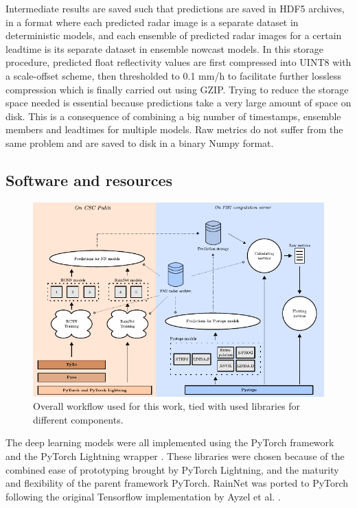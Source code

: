 Intermediate results are saved such that predictions are saved in HDF5 archives, in a format where each predicted radar image is a separate dataset in deterministic models, and each ensemble of predicted radar images for a certain leadtime is its separate dataset in ensemble nowcast models. In this storage procedure, predicted float reflectivity values are first compressed into UINT8 with a scale-offset scheme, then thresholded to 0.1 mm/h to facilitate further lossless compression which is finally carried out using GZIP. Trying to reduce the storage space needed is essential because predictions take a very large amount of space on disk. This is a consequence of combining a big number of timestamps, ensemble members and leadtimes for multiple models. Raw metrics do not suffer from the same problem and are saved to disk in a binary Numpy format.  

\subsection{Software and resources}

\begin{figure}
	\centering
	\includegraphics[width=\textwidth]{images/workflow/workflow}
	\caption{Overall workflow used for this work, tied with used libraries for different components.}
	\label{fig:workflow}
\end{figure}

The deep learning models were all implemented using the PyTorch framework and the PyTorch Lightning wrapper \cite{Falcon_PyTorch_Lightning_2019}. These libraries were chosen because of the combined ease of prototyping brought by PyTorch Lightning, and the maturity and flexibility of the parent framework PyTorch. RainNet was ported to PyTorch following the original Tensorflow implementation by Ayzel et al. \cite{Ayzel2020RainNet}. 


